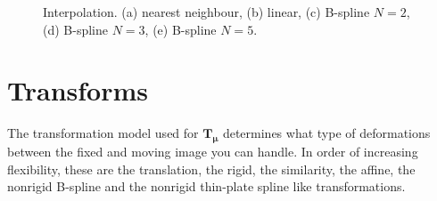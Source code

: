 \documentclass[]{report}
\newcommand{\vmu}{\bm{\mu}}
\newcommand{\vT}{\bm{T}}
\begin{document}
\begin{figure}
\centering
{}\label{sfig:interpolation:nn}
\label{sfig:interpolation:lin}
\label{sfig:interpolation:bs2}
\label{sfig:interpolation:bs3}
\label{sfig:interpolation:bs5}
\caption{Interpolation. (a) nearest neighbour, (b) linear, (c) B-spline $N=2$,
(d) B-spline $N=3$, (e) B-spline $N=5$.} \label{fig:interpolation}
\end{figure}

\section{Transforms}\label{sec:comp:transform}

The transformation model used for $\vT_{\vmu}$ determines what type of
deformations between the fixed and moving image you can handle. In order of
increasing flexibility, these are the translation, the rigid, the similarity,
the affine, the nonrigid B-spline and the nonrigid thin-plate spline like
transformations.
\end{document}
